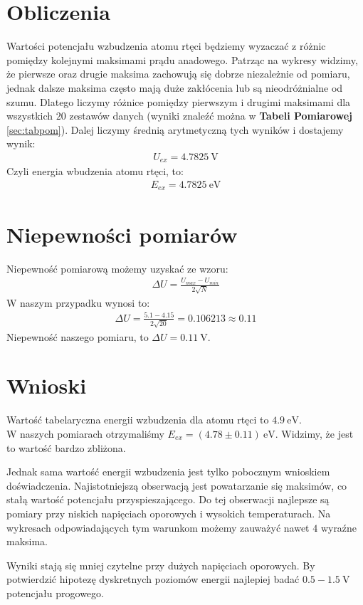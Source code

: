 \documentclass[paper=a4, fontsize=12pt]{scrartcl}
\begin{document}
\section{Obliczenia}
Wartości potencjału wzbudzenia atomu rtęci będziemy wyzaczać z różnic pomiędzy kolejnymi maksimami prądu anadowego. Patrząc na wykresy widzimy, że pierwsze oraz drugie maksima zachowują się dobrze niezależnie od pomiaru, jednak dalsze maksima często mają duże zakłócenia lub są nieodróżnialne od szumu. Dlatego liczymy różnice pomiędzy pierwszym i drugimi maksimami dla wszystkich $20$ zestawów danych (wyniki znaleźć można w \textbf{Tabeli Pomiarowej} \ref{sec:tabpom}). Dalej liczymy średnią arytmetyczną tych wyników i dostajemy wynik:
\begin{align*}
U_{ex}=4.7825\:\mathrm{V}
\end{align*}
Czyli energia wbudzenia atomu rtęci, to:
\begin{align}
E_{ex}=4.7825\:\mathrm{eV}
\end{align}
\section{Niepewności pomiarów}
Niepewność pomiarową możemy uzyskać ze wzoru:
\begin{align*}
\Delta U=\frac{U_{max}-U_{min}}{2\sqrt{N}}
\end{align*}
W naszym przypadku wynosi to:
\begin{align*}
\Delta U=\frac{5.1-4.15}{2\sqrt{20}}=0.106213\approx 0.11
\end{align*}
Niepewność naszego pomiaru, to $\Delta U=0.11\:\mathrm{V}$.
\section{Wnioski}
Wartość tabelaryczna energii wzbudzenia dla atomu rtęci to $4.9\:\mathrm{eV}$. \\
W naszych pomiarach otrzymaliśmy $E_{ex}=(4.78\pm0.11)\:\mathrm{eV}$. Widzimy, że jest to wartość bardzo zbliżona.

Jednak sama wartość energii wzbudzenia jest tylko pobocznym wnioskiem doświadczenia. Najistotniejszą obserwacją jest powatarzanie się maksimów, co stałą wartość potencjału przyspieszającego. Do tej obserwacji najlepsze są pomiary przy niskich napięciach oporowych i wysokich temperaturach. Na wykresach odpowiadających tym warunkom możemy zauważyć nawet $4$ wyraźne maksima.

Wyniki stają się mniej czytelne przy dużych napięciach oporowych. By potwierdzić hipotezę dyskretnych poziomów energii najlepiej badać $0.5-1.5\:\mathrm{V}$ potencjału progowego.
\end{document}
